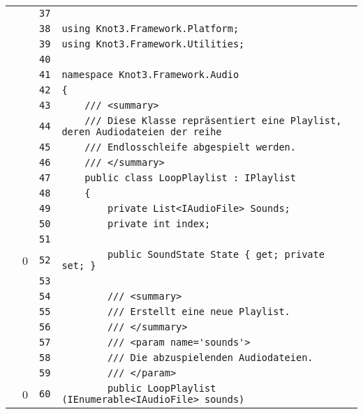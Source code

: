 \documentclass[a4paper,10pt]{article}
\begin{document}
\begin{longtable}[l]{lrrl}
\cellcolor{gray} &  & \verb~37~ & \verb~~\\
\cellcolor{gray} &  & \verb~38~ & \verb~using Knot3.Framework.Platform;~\\
\cellcolor{gray} &  & \verb~39~ & \verb~using Knot3.Framework.Utilities;~\\
\cellcolor{gray} &  & \verb~40~ & \verb~~\\
\cellcolor{gray} &  & \verb~41~ & \verb~namespace Knot3.Framework.Audio~\\
\cellcolor{gray} &  & \verb~42~ & \verb~{~\\
\cellcolor{gray} &  & \verb~43~ & \verb~    /// <summary>~\\
\cellcolor{gray} &  & \verb~44~ & \verb~    /// Diese Klasse repräsentiert eine Playlist, deren Audiodateien der reihe~\\
\cellcolor{gray} &  & \verb~45~ & \verb~    /// Endlosschleife abgespielt werden.~\\
\cellcolor{gray} &  & \verb~46~ & \verb~    /// </summary>~\\
\cellcolor{gray} &  & \verb~47~ & \verb~    public class LoopPlaylist : IPlaylist~\\
\cellcolor{gray} &  & \verb~48~ & \verb~    {~\\
\cellcolor{gray} &  & \verb~49~ & \verb~        private List<IAudioFile> Sounds;~\\
\cellcolor{gray} &  & \verb~50~ & \verb~        private int index;~\\
\cellcolor{gray} &  & \verb~51~ & \verb~~\\
\cellcolor{red} & 0 & \verb~52~ & \verb~        public SoundState State { get; private set; }~\\
\cellcolor{gray} &  & \verb~53~ & \verb~~\\
\cellcolor{gray} &  & \verb~54~ & \verb~        /// <summary>~\\
\cellcolor{gray} &  & \verb~55~ & \verb~        /// Erstellt eine neue Playlist.~\\
\cellcolor{gray} &  & \verb~56~ & \verb~        /// </summary>~\\
\cellcolor{gray} &  & \verb~57~ & \verb~        /// <param name='sounds'>~\\
\cellcolor{gray} &  & \verb~58~ & \verb~        /// Die abzuspielenden Audiodateien.~\\
\cellcolor{gray} &  & \verb~59~ & \verb~        /// </param>~\\
\cellcolor{red} & 0 & \verb~60~ & \verb~        public LoopPlaylist (IEnumerable<IAudioFile> sounds)~\\

\end{longtable}
\end{document}
